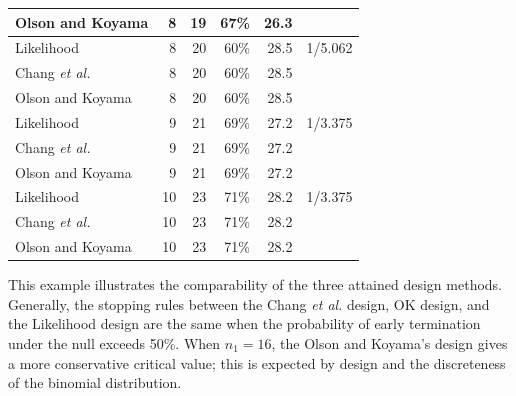 \documentclass[12pt]{report}\usepackage[]{graphicx}\usepackage[]{color}
\newlength{\li}\setlength{\li}{14.48pt}
\newlength{\di}\setlength{\di}{-3.5mm}
\begin{document}
\begin{table}[]
\begin{tabular}{|L|R|R|R|R|L|}
Olson and Koyama & 8     & 19    & 67\%           & 26.3          &                                                                                    \\ \hline
Likelihood       & 8     & 20    & 60\%           & 28.5          & 1/5.062                                                                            \\ \hline
Chang \textit{et al.}           & 8     & 20    & 60\%           & 28.5          &                                                                                    \\ \hline
Olson and Koyama & 8     & 20    & 60\%           & 28.5          &                                                                                    \\ \hline
Likelihood       & 9     & 21    & 69\%           & 27.2          & 1/3.375                                                                            \\ \hline
Chang \textit{et al.}         & 9     & 21    & 69\%           & 27.2          &                                                                                    \\ \hline
Olson and Koyama & 9     & 21    & 69\%           & 27.2          &                                                                                    \\ \hline
Likelihood       & 10    & 23    & 71\%           & 28.2          & 1/3.375                                                                            \\ \hline
Chang \textit{et al.}  & 10    & 23    & 71\%           & 28.2          &                                                                                    \\ \hline
Olson and Koyama & 10    & 23    & 71\%           & 28.2          &                                                                                    \\ \hline
\end{tabular}
\hspace*{-0.1cm}
\end{table}

This example illustrates the comparability of the three attained design methods. Generally, the stopping rules between the Chang \textit{et al.} design, OK design, and the Likelihood design are the same when the probability of early termination under the null exceeds 50\%. When $n_1 = 16$, the Olson and Koyama's design gives a more conservative critical value; this is expected by design and the discreteness of the binomial distribution. 
\end{document}
